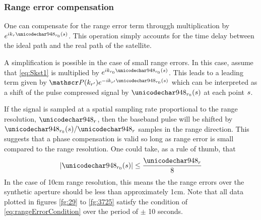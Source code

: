 \subsubsection{Range error compensation}
\label{sc:phaseCompensation}
One can compensate for the range error term througgh multiplication by $\eex{\im\kr\rangeErrorZero(\parm)}$. This operation simply accounts for the time delay between the ideal path and the real path of the satellite.
\par
A simplification is possible in the case of small range errors. In this case, assume that \eqref{eq:Skst1} is multiplied by $\eex{\im\krnaught\rangeErrorZero(\parm)}$. This leads to a leading term given by $\Snvelope(\krc)\eex{-\im\krc\rangeErrorZero(\parm)}$ which can be interpreted as a shift of the pulse compressed signal by $\rangeErrorZero(\parm)$ at each point $s$. 
\par
If the signal is sampled at a spatial sampling rate proportional to the range resolution, $\rresolution$, then the baseband pulse will be shifted by $\rangeErrorZero(\parm)/\rresolution$ samples in the range direction. This suggests that a phase compensation is valid so long as range error is small compared to the range resolution. One could take, as a rule of thumb, that 
\begin{equation}
\lvert\rangeErrorZero(\parm)\rvert\leq\frac{\rresolution}{8} 
\label{eq:rangeErrorCondition}
\end{equation}
In the case of 10cm range resolution, this means the the range errors over the synthetic aperture should be less than approximately 1cm. Note that all data plotted in figures \ref{fg:29} to \ref{fg:3725} satisfy the condition of \eqref{eq:rangeErrorCondition} over the period of $\pm$ 10 seconds.

